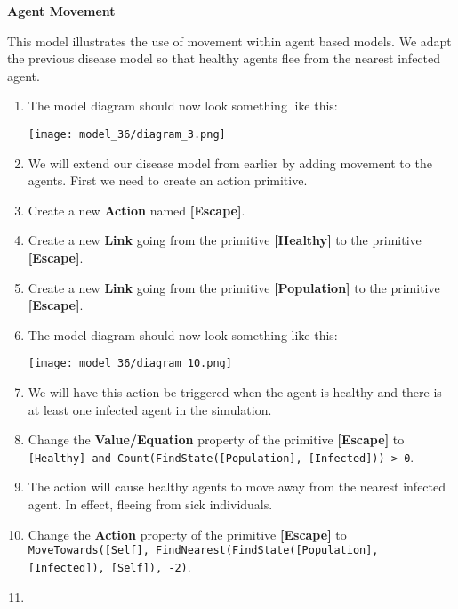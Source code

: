 \documentclass[]{memoir}
\makeatletter
\def\maxwidth{\ifdim\Gin@nat@width>\linewidth\linewidth
\else\Gin@nat@width\fi}
\let\Oldincludegraphics\includegraphics
\renewcommand{\includegraphics}[1]{\Oldincludegraphics[width=\maxwidth]{#1}}
\newcommand{\p}[1]{\textbf{{[}#1{]}}}
\newcommand{\e}[1]{\texttt{#1}}
\renewcommand{\a}[1]{\textbf{#1}}
\makeatother
\begin{document}
\begin{oframed}\textbf{Agent Movement} 

 This model illustrates the use of movement within agent based models. We adapt the previous disease model so that healthy agents flee from the nearest infected agent.

\begin{enumerate}
\item The model diagram should now look something like this: \par \begin{minipage}{\linewidth}  \centering \texttt{[image: model\_36/diagram\_3.png]}
\end{minipage}
\item 

We will extend our disease model from earlier by adding movement to the agents. First we need to create an action primitive.


\item Create a new \a{Action} named \p{Escape}.
\item Create a new \a{Link} going from the primitive \p{Healthy} to the primitive \p{Escape}.
\item Create a new \a{Link} going from the primitive \p{Population} to the primitive \p{Escape}.
\item The model diagram should now look something like this: \par \begin{minipage}{\linewidth}  \centering \texttt{[image: model\_36/diagram\_10.png]}
\end{minipage}
\item 

We will have this action be triggered when the agent is healthy and there is at least one infected agent in the simulation.


\item  Change the \a{Value/Equation} property of the primitive \p{Escape} to \e{[Healthy] and Count(FindState([Population], [Infected])) > 0}.
\item 

The action will cause healthy agents to move away from the nearest infected agent. In effect, fleeing from sick individuals.


\item  Change the \a{Action} property of the primitive \p{Escape} to \e{MoveTowards([Self], FindNearest(FindState([Population], [Infected]), [Self]), -2)}.
\item 


\end{enumerate}
\end{oframed}
\end{document}
